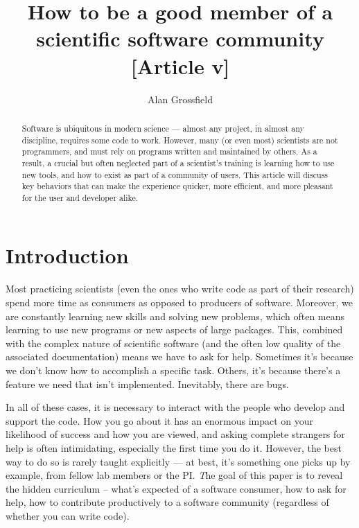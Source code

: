 \documentclass[9pt,training]{livecoms}
\title{How to be a good member of a scientific software community [Article v\versionnumber]}
\author[1*]{Alan Grossfield}
\affil[1]{University of Rochester Medical Center, Department of Biochemistry and Biophysics}
\begin{document}
\begin{frontmatter}
\maketitle

\begin{abstract}

Software is ubiquitous in modern science --- almost any project, in almost any
discipline, requires some code to work. However, many (or even most) scientists
are not programmers, and must rely on programs written and maintained by others.
As a result, a crucial but often neglected part of a scientist's training is
learning how to use new tools, and how to exist as part of a community of users.
This article will discuss key behaviors that can make the experience quicker,
more efficient, and more pleasant for the user and developer alike.


\end{abstract}

\end{frontmatter}




\section{Introduction}

Most practicing scientists (even the ones who write code as part of their
research) spend more time as consumers as opposed to producers of software.
Moreover, we are constantly learning new skills and solving new problems, which
often means learning to use new programs or new aspects of large packages. This,
combined with the complex nature of scientific software (and the often low
quality of the associated documentation) means we have to ask for help.
Sometimes it's because we don't know how to accomplish a specific task. Others,
it's because there's a feature we need that isn't implemented. Inevitably, there
are bugs.

In all of these cases, it is necessary to interact with the people who develop
and support the code. How you go about it has an enormous impact on your
likelihood of success and how you are viewed, and asking complete strangers for
help is often intimidating, especially the first time you do it. However, the
best way to do so is rarely taught explicitly --- at best, it's something one
picks up by example, from fellow lab members or the PI.  {\emph The goal of this
paper is to reveal the hidden curriculum -- what's expected of a software
consumer, how to ask for help, how to contribute productively to a software
community (regardless of whether you can write code).}
\end{document}
